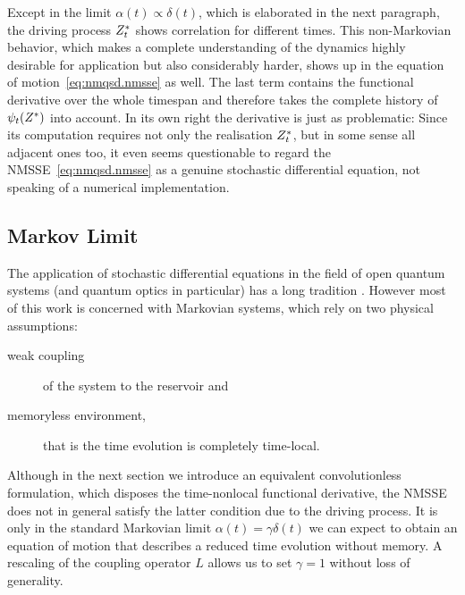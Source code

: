 Except in the limit $\alpha(t) \propto \delta(t)$, which is elaborated in the next paragraph, the driving process ${Z}^*_t$ shows correlation for different times.
This non-Markovian behavior, which makes a complete understanding of the dynamics highly desirable for application but also considerably harder, shows up in the equation of motion~\ref{eq:nmqsd.nmsse} as well.
The last term contains the functional derivative over the whole timespan and therefore takes the complete history of $\psi_t({Z}^*)$ into account.
In its own right the derivative is just as problematic:
Since its computation requires not only the realisation ${Z}^*_t$, but in some sense all adjacent ones too, it even seems questionable to regard the NMSSE~\ref{eq:nmqsd.nmsse} as a genuine stochastic differential equation, not speaking of a numerical implementation.



\subsection{Markov Limit}
\label{sub:nmqsd.markov}

The application of stochastic differential equations in the field of open quantum systems (and quantum optics in particular) has a long tradition \cite{???}.
However most of this work is concerned with Markovian systems, which rely on two physical assumptions:
\begin{description}
  \item[weak coupling] of the system to the reservoir and
  \item[memoryless environment,] that is the time evolution is completely time-local.
\end{description}
Although in the next section we introduce an equivalent convolutionless formulation, which disposes the time-nonlocal functional derivative, the NMSSE does not in general satisfy the latter condition due to the driving process.
It is only in the standard Markovian limit $\alpha(t) = \gamma\delta(t)$ we can expect to obtain an equation of motion that describes a reduced time evolution without memory.
A rescaling of the coupling operator $L$ allows us to set $\gamma = 1$ without loss of generality.


